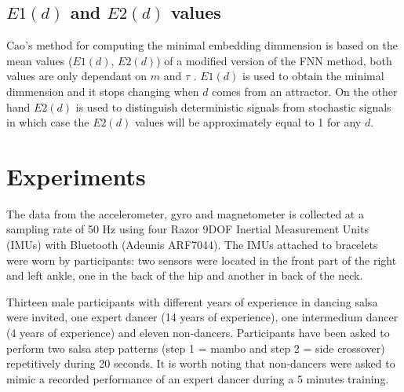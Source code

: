 \documentclass{sigchi}
\begin{document}
\subsection{$E1(d)$ and $E2(d)$ values}
Cao's method for computing the minimal embedding dimmension is based on the mean values ($E1(d)$, $E2(d)$) of a
modified version of the FNN method, both values are only dependant on $m$ and $\tau$ \cite{Cao1997}.
$E1(d)$ is used to obtain the minimal dimmension and it stops changing when $d$ comes from an attractor.
On the other hand $E2(d)$ is used to distinguish deterministic signals from stochastic signals 
in which case the $E2(d)$ values will be approximately equal to 1 for any $d$.






\section{Experiments}
The data from the  accelerometer, gyro and magnetometer is collected at a 
sampling rate of 50 Hz using four Razor 9DOF Inertial Measurement Units (IMUs) with 
Bluetooth (Adeunis ARF7044).  The IMUs attached to bracelets were worn by participants:
two sensors were located in the front part of the right and left ankle, 
one in the back of the hip and another in back of the neck.

Thirteen male participants with different years of experience in dancing salsa were invited,
one expert dancer (14 years of experience), one intermedium dancer (4 years of experience)
and eleven non-dancers. Participants have been asked to perform two salsa step patterns 
(step 1 = mambo and step 2 = side crossover) repetitively during 20 seconds. 
It is worth noting that non-dancers were asked to mimic a recorded performance of an expert dancer
during a 5 minutes training.
\end{document}
